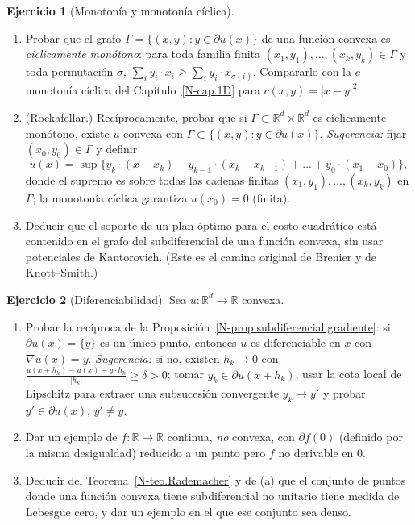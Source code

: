 \documentclass[11pt,a4paper]{amsart}
\newcounter{chapter}
\newcommand{\R}{{\mathbb R}}
\theoremstyle{remark}
\theoremstyle{definition}
\newtheorem{ejercicio}{Ejercicio}[chapter]
\numberwithin{subsection}{section}
\numberwithin{equation}{section}
\begin{document}
\begin{ejercicio}[Monotonía y monotonía cíclica]\label{ejer.subdif.monotono}
\leavevmode
\begin{enumerate}[label=(\alph*)]
\item Probar que el grafo $\Gamma=\{(x,y):y\in\partial u(x)\}$ de una función
convexa es \emph{cíclicamente monótono}: para toda familia finita
$(x_1,y_1),\dots,(x_k,y_k)\in\Gamma$ y toda permutación $\sigma$,
$\sum_iy_i\cdot x_i\ge\sum_iy_i\cdot x_{\sigma(i)}$. Compararlo con la
$c$-monotonía cíclica del Capítulo~\ref{N-cap.1D} para $c(x,y)=|x-y|^2$.
\item (Rockafellar.) Recíprocamente, probar que si $\Gamma\subset\R^d\times\R^d$
es cíclicamente monótono, existe $u$ convexa con $\Gamma\subset\{(x,y):y\in\partial u(x)\}$.
\emph{Sugerencia:} fijar $(x_0,y_0)\in\Gamma$ y definir
\[
u(x)=\sup\bigl\{y_k\cdot(x-x_k)+y_{k-1}\cdot(x_k-x_{k-1})+\dots+y_0\cdot(x_1-x_0)\bigr\},
\]
donde el supremo es sobre todas las cadenas finitas $(x_1,y_1),\dots,(x_k,y_k)$
en $\Gamma$; la monotonía cíclica garantiza $u(x_0)=0$ (finita).
\item Deducir que el soporte de un plan óptimo para el costo cuadrático está
contenido en el grafo del subdiferencial de una función convexa, sin usar
potenciales de Kantorovich. (Este es el camino original de Brenier y de
Knott--Smith.)
\end{enumerate}
\end{ejercicio}

\begin{ejercicio}[Diferenciabilidad]\label{ejer.subdif.diferenciabilidad}
Sea $u\colon\R^d\to\R$ convexa.
\begin{enumerate}[label=(\alph*)]
\item Probar la recíproca de la Proposición~\ref{N-prop.subdiferencial.gradiente}:
si $\partial u(x)=\{y\}$ es un único punto, entonces $u$ es diferenciable en
$x$ con $\nabla u(x)=y$. \emph{Sugerencia:} si no, existen $h_k\to0$ con
$\frac{u(x+h_k)-u(x)-y\cdot h_k}{|h_k|}\ge\delta>0$; tomar
$y_k\in\partial u(x+h_k)$, usar la cota local de Lipschitz para extraer
una subsucesión convergente $y_k\to y'$ y probar $y'\in\partial u(x)$,
$y'\ne y$.
\item Dar un ejemplo de $f\colon\R\to\R$ continua, \emph{no} convexa, con
$\partial f(0)$ (definido por la misma desigualdad) reducido a un punto pero
$f$ no derivable en $0$.
\item Deducir del Teorema~\ref{N-teo.Rademacher} y de (a) que el conjunto de
puntos donde una función convexa tiene subdiferencial no unitario tiene
medida de Lebesgue cero, y dar un ejemplo en el que ese conjunto sea denso.
\end{enumerate}
\end{ejercicio}
\end{document}
